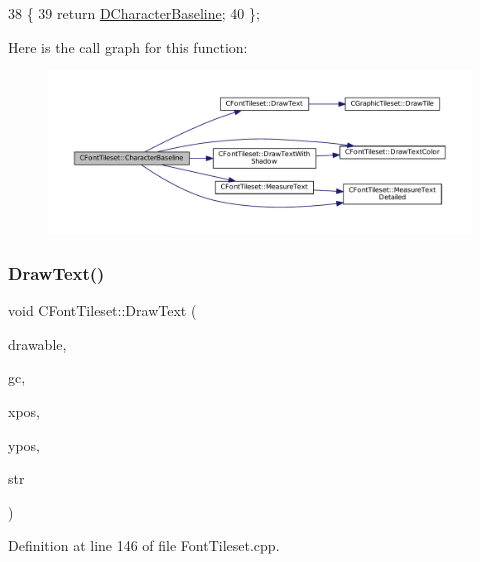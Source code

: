 \begin{DoxyCode}
38                                       \{
39             \textcolor{keywordflow}{return} \hyperlink{classCFontTileset_aba19d07744c08aeb957728067c52466c}{DCharacterBaseline};  
40         \};
\end{DoxyCode}
Here is the call graph for this function\+:
\nopagebreak
\begin{figure}[H]
\begin{center}
\leavevmode
\includegraphics[width=350pt]{classCFontTileset_a888dd4fe8f46b35550386a1997f4376a_cgraph}
\end{center}
\end{figure}
\hypertarget{classCFontTileset_a4121603694e96e93378e079edd27086e}{}\label{classCFontTileset_a4121603694e96e93378e079edd27086e} 
\subsubsection{\texorpdfstring{Draw\+Text()}{DrawText()}}
{\footnotesize\ttfamily void C\+Font\+Tileset\+::\+Draw\+Text (\begin{DoxyParamCaption}\item[{Gdk\+Drawable $\ast$}]{drawable,  }\item[{Gdk\+GC $\ast$}]{gc,  }\item[{gint}]{xpos,  }\item[{gint}]{ypos,  }\item[{const std\+::string \&}]{str }\end{DoxyParamCaption})}



Definition at line 146 of file Font\+Tileset.\+cpp.


